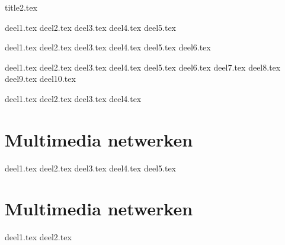 \documentclass[a4paper,11pt]{article}
\begin{document}


{title2.tex}

\clearpage

\thispagestyle{empty}

\tableofcontents

\clearpage

\setcounter{section}{3}
\newpage
{deel1.tex}
{deel2.tex}
{deel3.tex}
{deel4.tex}
{deel5.tex}

\newpage
{deel1.tex}
{deel2.tex}
{deel3.tex}
{deel4.tex}
{deel5.tex}
{deel6.tex}

\newpage
{deel1.tex}
{deel2.tex}
{deel3.tex}
{deel4.tex}
{deel5.tex}
{deel6.tex}
{deel7.tex}
{deel8.tex}
{deel9.tex}
{deel10.tex}


\newpage
{deel1.tex}
{deel2.tex}
{deel3.tex}
{deel4.tex}


\newpage
\section{Multimedia netwerken}
{deel1.tex}
{deel2.tex}
{deel3.tex}
{deel4.tex}
{deel5.tex}

\newpage
\section{Multimedia netwerken}
{deel1.tex}
{deel2.tex}
\end{document}
